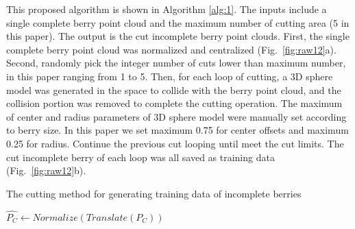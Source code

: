 \documentclass[12pt]{article}
\begin{document}
This proposed algorithm is shown in Algorithm \ref{alg:1}. 
The inputs include a single complete berry point cloud and the maximum number of cutting area (5 in this paper). 
The output is the cut incomplete berry point clouds. First, the single complete berry point cloud was normalized and centralized (Fig.~\ref{fig:raw12}a). 
Second, randomly pick the integer number of cuts lower than maximum number, in this paper ranging from 1 to 5. 
Then, for each loop of cutting, a 3D sphere model was generated in the space to collide with the berry point cloud, and the collision portion was removed to complete the cutting operation. 
The maximum of center and radius parameters of 3D sphere model were manually set according to berry size. 
In this paper we set maximum 0.75 for center offsets and maximum 0.25 for radius. 
Continue the previous cut looping until meet the cut limits. The cut incomplete berry of each loop was all saved as training data (Fig.~\ref{fig:raw12}b). 

\begin{algorithm}
    \caption{The cutting method for generating training data of incomplete berries}
    \label{alg:1}
    
    $\hat{P_C} \gets Normalize(Translate(P_C))$ 
\end{algorithm}
\end{document}
